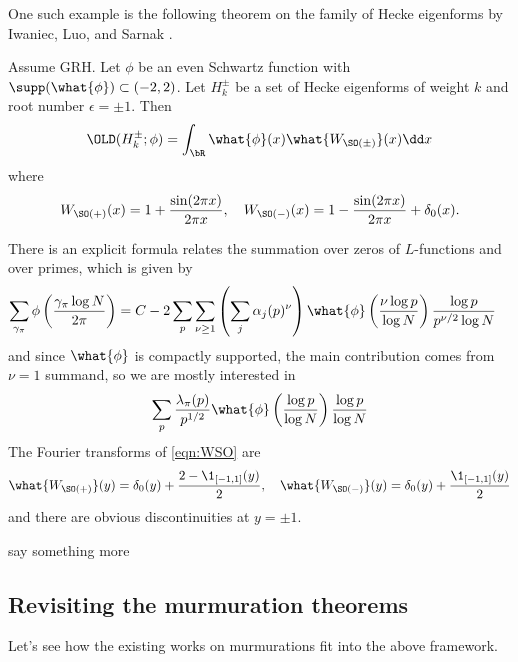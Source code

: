 One such example is the following theorem on the family of Hecke eigenforms by Iwaniec, Luo, and Sarnak \cite{iwaniec2000low}.
\begin{theorem}
    Assume GRH. Let $\phi$ be an even Schwartz function with $\supp(\what{\phi}) \subset (-2, 2)$.
    Let $H_k^\pm$ be a set of Hecke eigenforms of weight $k$ and root number $\epsilon = \pm 1$.
    Then
    \begin{equation}
        \OLD(H_k^\pm; \phi) = \int_{\bR} \what{\phi}(x) \what{W_{\SO(\pm)}}(x) \dd x
    \end{equation}
    where
    \begin{equation}
        \label{eqn:WSO}
        W_{\SO(+)}(x) = 1 + \frac{\sin(2\pi x)}{2 \pi x}, \quad W_{\SO(-)}(x) = 1 - \frac{\sin(2\pi x)}{2 \pi x} + \delta_0(x).
    \end{equation}
\end{theorem}
There is an explicit formula relates the summation over zeros of $L$-functions and over primes, which is given by \cite[Section 4]{iwaniec2000low}
\begin{align*}
    \sum_{\gamma_\pi} \phi\left(\frac{\gamma_\pi \log N}{2\pi}\right) &= C - 2 \sum_p \sum_{\nu \ge 1} \left(\sum_{j} \alpha_j(p)^\nu\right) \what{\phi}\left(\frac{\nu \log p}{\log N}\right) \frac{\log p}{p^{\nu/2} \log N}
\end{align*}
and since $\what{\phi}$ is compactly supported, the main contribution comes from $\nu = 1$ summand, so we are mostly interested in 
\begin{equation}
    \sum_{p} \frac{\lambda_\pi(p)}{p^{1/2}} \what{\phi}\left(\frac{\log p}{\log N}\right) \frac{\log p}{\log N} 
\end{equation}
The Fourier transforms of \eqref{eqn:WSO} are
\begin{equation}
    \what{W_{\SO(+)}}(y) = \delta_0(y) + \frac{2 - \1_{[-1, 1]}(y)}{2}, \quad \what{W_{\SO(-)}}(y) = \delta_0(y) + \frac{\1_{[-1, 1]}(y)}{2}
\end{equation}
and there are obvious discontinuities at $y = \pm 1$.

\ber say something more\er



\subsection{Revisiting the murmuration theorems}

Let's see how the existing works on murmurations fit into the above framework.


